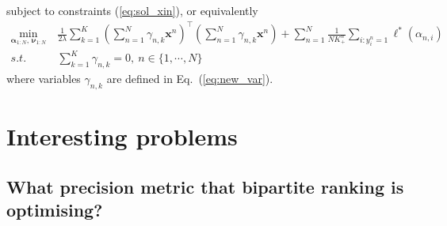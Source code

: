 \documentclass[9pt]{extarticle}
\newcommand{\llb}{\llbracket}
\newcommand{\rrb}{\rrbracket}
\newcommand{\x}{\mathbf{x}}
\newcommand{\1}{\mathbf{1}}
\newcommand{\w}{\mathbf{w}}
\newcommand{\alphabm}{\bm{\alpha}}
\newcommand{\nubm}{\bm{\nu}}
\newcommand{\pb}[1]{^{({#1})}}
\begin{document}
subject to constraints (\ref{eq:sol_xin}),
or equivalently
\begin{equation}
\label{eq:tpush_dual}
\begin{aligned}
\underset{\alphabm_{1:N}, \, \nubm_{1:N}}{\min} \ &
    \frac{1}{2 \lambda} \sum_{k=1}^K \left( \sum_{n=1}^N \gamma_{n,k} \x^n \right)^\top \left( \sum_{n=1}^N \gamma_{n,k} \x^n \right) +
    \sum_{n=1}^N \frac{1}{N K_+^n} \sum_{i:y_i^n=1} \ell^*(\alpha_{n,i}) \\
s.t. \ \quad & \sum_{k=1}^K \gamma_{n,k} = 0, \ n \in \{1,\cdots,N\}
\end{aligned}
\end{equation}
where variables $\gamma_{n,k}$ are defined in Eq.~(\ref{eq:new_var}).





\newpage
\thispagestyle{empty}

\section*{Interesting problems}

\subsection*{What precision metric that bipartite ranking is optimising?}
\end{document}
